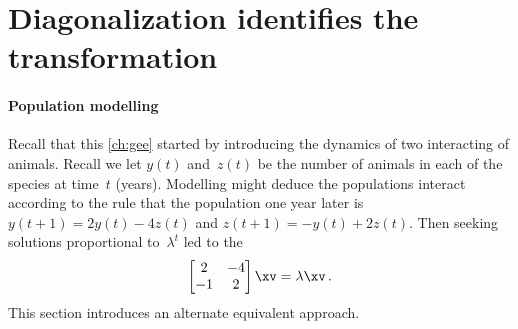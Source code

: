 

\section{Diagonalization identifies the transformation}
\label{sec:dit}

\secttoc
\begin{comment}
\pooliv{\S4.4} \layiv{\S5.3} \holti{\S6.4} \cite[\S09]{Davis99a}
\end{comment}


\paragraph{Population modelling} 
Recall that this \autoref{ch:gee} started by introducing the dynamics of two interacting  of animals.
Recall we let \(y(t)\) and~\(z(t)\) be the number of  animals in each of the species at time~\(t\) (years). 
Modelling might deduce the populations interact according to the rule that the population one year later is \(y(t+1)=2y(t)-4z(t)\) and \(z(t+1)=-y(t)+2z(t)\).
Then seeking solutions proportional to~\(\lambda^t\) led to the 
\begin{equation*}
\begin{bmatrix} 2&-4\\-1&2 \end{bmatrix}\xv=\lambda\xv\,.
\end{equation*}
This section introduces an alternate equivalent approach.


